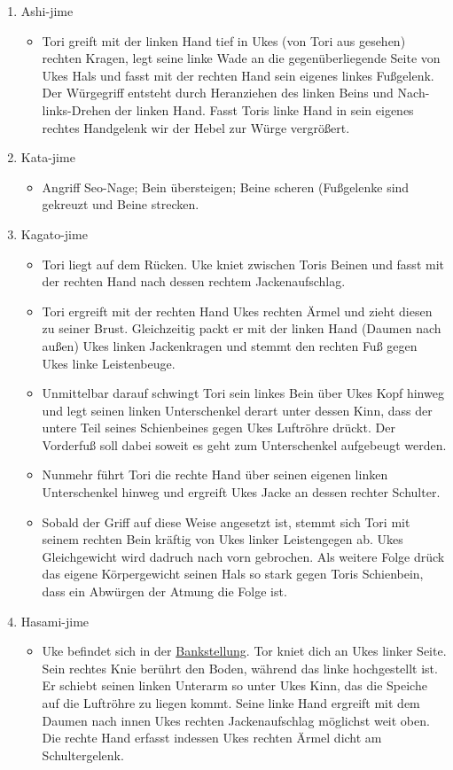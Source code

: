 \documentclass[justified, a4paper, notitlepage, captions=tableheading, nobib]{tufte-handout}
\begin{document}
\begin{itemize}
\begin{enumerate}
\item Ashi-jime 
\begin{itemize}
\item Tori greift mit der linken Hand tief in Ukes (von Tori aus gesehen) rechten Kragen, legt seine linke Wade an die gegenüberliegende Seite von Ukes Hals und fasst mit der rechten Hand sein eigenes linkes Fußgelenk. Der Würgegriff entsteht durch Heranziehen des linken Beins und Nach-links-Drehen der linken Hand. Fasst Toris linke Hand in sein eigenes rechtes Handgelenk wir der Hebel zur Würge vergrößert.
\end{itemize}
\item Kata-jime 
\begin{itemize}
\item Angriff Seo-Nage; Bein übersteigen; Beine scheren (Fußgelenke sind gekreuzt und Beine strecken.
\end{itemize}
\item Kagato-jime 
\begin{itemize}
\item Tori liegt auf dem Rücken. Uke kniet zwischen Toris Beinen und fasst mit der rechten Hand nach dessen rechtem Jackenaufschlag.
\item Tori ergreift mit der rechten Hand Ukes rechten Ärmel und zieht diesen zu seiner Brust. Gleichzeitig packt er mit der linken Hand (Daumen nach außen) Ukes linken Jackenkragen und stemmt den rechten Fuß gegen Ukes linke Leistenbeuge.
\item Unmittelbar darauf schwingt Tori sein linkes Bein über Ukes Kopf hinweg und legt seinen linken Unterschenkel derart unter dessen Kinn, dass der untere Teil seines Schienbeines gegen Ukes Luftröhre drückt. Der Vorderfuß  soll dabei soweit es geht zum Unterschenkel  aufgebeugt werden.
\item Nunmehr führt Tori die rechte Hand über seinen eigenen linken Unterschenkel hinweg und ergreift Ukes Jacke an dessen rechter Schulter.
\item Sobald der Griff auf diese Weise angesetzt ist, stemmt sich Tori mit seinem rechten Bein kräftig von Ukes linker Leistengegen ab. Ukes Gleichgewicht wird dadruch nach vorn gebrochen. Als weitere Folge drück das eigene Körpergewicht seinen Hals so stark gegen Toris Schienbein, dass ein Abwürgen der Atmung die Folge ist.
\end{itemize}
\item Hasami-jime 
\begin{itemize}
\item Uke befindet sich in der \hyperref[orgf95c5ab]{Bankstellung}. Tor kniet dich an Ukes linker Seite. Sein rechtes Knie berührt den Boden, während das linke hochgestellt ist. Er schiebt seinen linken Unterarm so unter Ukes Kinn, das die Speiche auf die Luftröhre zu liegen kommt. Seine linke Hand ergreift mit dem Daumen nach innen Ukes rechten Jackenaufschlag möglichst weit oben. Die rechte Hand erfasst indessen Ukes rechten Ärmel dicht am Schultergelenk.

\end{itemize}
\end{enumerate}
\end{itemize}
\end{document}

